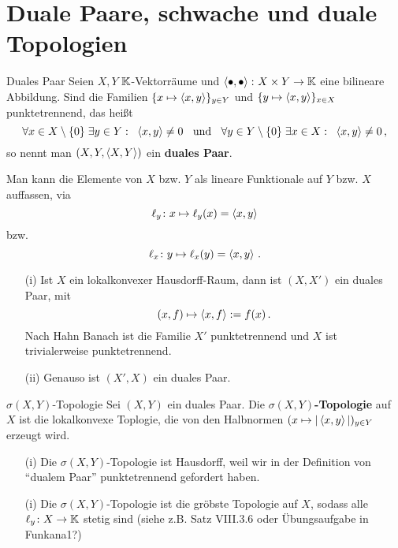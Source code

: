 \documentclass{article}
\begin{document}
	\section{Duale Paare, schwache und duale Topologien}
	
	\begin{Def}{Duales Paar}{}
		Seien $X,Y$ $\operatorname{\mathbb K}$-Vektorräume und $\left\langle \bullet,\bullet\right\rangle\colon X\times Y\to \operatorname{\mathbb K}$ eine bilineare Abbildung. Sind die Familien $\{x\mapsto \left\langle x,y\right\rangle\}_{y\in Y}$ und $\{y\mapsto \left\langle x,y\right\rangle\}_{x\in X}$ punktetrennend, das heißt
		\[\forall x\in X\setminus\{0\}\;\exists y\in Y:\;\;\left\langle x,y\right\rangle\ne 0\;\;\text{ und }\;\;\forall y\in Y\setminus\{0\}\;\exists x\in X:\;\;\left\langle x,y\right\rangle\ne 0\,,\]
		so nennt man $(X,Y,\left\langle X,Y\right\rangle)$ ein \textbf{duales Paar}.
	\end{Def}
	
	\begin{Bemerkung}{}{}
		Man kann die Elemente von $X$ bzw. $Y$ als lineare Funktionale auf $Y$ bzw. $X$ auffassen, via
		\[\ell_{y}\colon x\mapsto \ell_{y}(x)=\left\langle x,y\right\rangle\]
		bzw.
		\[\ell_{x}\colon y\mapsto \ell_{x}(y)=\left\langle x,y\right\rangle\,.\]
	\end{Bemerkung}
	
	\begin{Beispiel}{}{}
		\begin{itemize}
			\item[(i)] Ist $X$ ein lokalkonvexer Hausdorff-Raum, dann ist $(X,X')$ ein duales Paar, mit
			\[(x,f)\mapsto \left\langle x,f\right\rangle:=f(x)\,.\]
			Nach Hahn Banach ist die Familie $X'$ punktetrennend und $X$ ist trivialerweise punktetrennend.
			\item[(ii)] Genauso ist $(X',X)$ ein duales Paar.
		\end{itemize}
	\end{Beispiel}
	
	\begin{Def}{$\sigma(X,Y)$-Topologie}{}
		Sei $(X,Y)$ ein duales Paar. Die \textbf{$\sigma(X,Y)$-Topologie} auf $X$ ist die lokalkonvexe Toplogie, die von den Halbnormen $(x\mapsto|\left\langle x,y\right\rangle|)_{y\in Y}$ erzeugt wird.
	\end{Def}
	
	\begin{Bemerkung}{}{}
		\begin{itemize}
			\item[(i)] Die $\sigma(X,Y)$-Topologie ist Hausdorff, weil wir in der Definition von \enquote{dualem Paar} punktetrennend gefordert haben.
			\item[(i)] Die $\sigma(X,Y)$-Topologie ist die gröbste Topologie auf $X$, sodass alle $\ell_{y}\colon X\to \operatorname{\mathbb K}$ stetig sind (siehe z.B. Satz VIII.3.6 oder Übungsaufgabe in Funkana1?)
		\end{itemize}
	\end{Bemerkung}
	
\end{document}
